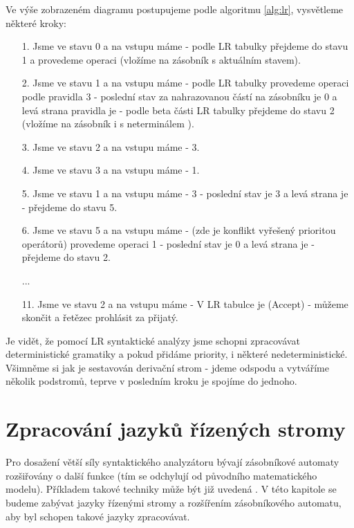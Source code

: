 \begin{exmp}
Ve výše zobrazeném diagramu postupujeme podle algoritmu \ref{alg:lr},
vysvětleme některé kroky:
  \begin{itemize}
    \item[1.] Jsme ve stavu 0 a na vstupu máme  - podle LR tabulky přejdeme do
    stavu 1 a provedeme operaci  (vložíme  na zásobník s aktuálním stavem).
    \item[2.] Jsme ve stavu 1 a na vstupu máme \symb{*} - podle LR tabulky provedeme
    operaci  podle pravidla 3 - poslední stav za nahrazovanou částí na
    zásobníku je 0 a levá strana pravidla je  - podle beta části LR tabulky
    přejdeme do stavu 2 (vložíme na zásobník i s neterminálem ).
    \item[3.] Jsme ve stavu 2 a na vstupu máme \symb{*} -  3.
    \item[4.] Jsme ve stavu 3 a na vstupu máme  -  1.
    \item[5.] Jsme ve stavu 1 a na vstupu máme \symb{+} -  3
     - poslední stav je 3 a levá strana je  - přejdeme do stavu 5.
    \item[6.] Jsme ve stavu 5 a na vstupu máme \symb{+} - (zde je konflikt vyřešený prioritou operátorů)
    provedeme operaci  1 - poslední stav je 0 a levá strana je  - přejdeme do stavu 2.
    \item[] ...
    \item[11.] Jsme ve stavu 2 a na vstupu máme \symb{\$} - V LR tabulce je 
    (Accept) - můžeme skončit a řetězec prohlásit za přijatý.
  \end{itemize}
\end{exmp}

Je vidět, že pomocí LR syntaktické analýzy jsme schopni zpracovávat deterministické
gramatiky a pokud přidáme priority, i některé nedeterministické. Všimněme si jak je
sestavován derivační strom - jdeme odspodu a vytváříme několik podstromů,
teprve v posledním kroku je spojíme do jednoho.


\chapter{Zpracování jazyků řízených stromy}
\label{chap:TreeLangs}

Pro dosažení větší síly syntaktického analyzátoru bývají zásobníkové automaty
rozšiřovány o další funkce (tím se odchylují od původního matematického modelu).
Příkladem takové techniky může být již uvedená .
V této kapitole se budeme zabývat jazyky řízenými stromy a rozšířením
zásobníkového automatu, aby byl schopen takové jazyky zpracovávat.\\

